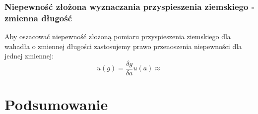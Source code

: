 \documentclass[a4paper,12pts]{article}
\begin{document}
	\subsubsection{Niepewność złożona wyznaczania przyspieszenia ziemskiego - zmienna długość}
	Aby oszacować niepewność złożoną pomiaru przyspieszenia ziemskiego dla wahadła o zmiennej długości zastosujemy prawo przenoszenia niepewności dla jednej zmiennej:
	\begin{equation}
		u(g) = \frac{\delta g}{\delta a} u(a) \approx
	\end{equation}
	

	\section{Podsumowanie}

		
\end{document}
